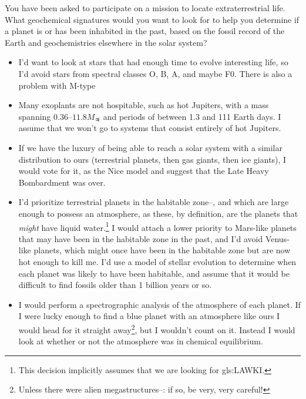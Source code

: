 \documentclass[]{article}
\begin{document}
You have been asked to participate on a mission to locate extraterrestrial life. What geochemical signatures would you want to look for to help you determine if a planet is or has been inhabited in the past, based on the fossil record of the Earth and geochemistries elsewhere in the solar system?

\begin{itemize}
	\item I'd want to look at stars that had enough time to evolve interesting life, so I'd avoid stars from spectral classes O, B, A, and maybe F0\cite{antf2019spectral}. There is also a problem with M-type\cite{dvorskywim2015this}
	\item Many exoplants are not hospitable, such as hot Jupiters\cite{ wiki:hot:jupiter}, with a mass spanning $0.36\text{--}11.8M_{\jupiter}$ and periods of between 1.3 and 111 Earth days. I assume that we won't go to systems that consist entirely of hot Jupiters.
	\item If we have the luxury of being able to reach a solar system with a similar distribution to ours (terrestrial planets, then gas giants, then ice giants), I would vote for it, as the Nice model \cite{morbidelli2010coherent} and \cite{gomes2005origin} suggest that the Late Heavy Bombardment was over.
	\item I'd prioritize terrestrial planets in the habitable zone--\cite{nasa2019goldilocks}, and which are large enough to possess an atmosphere, as these, by definition, are the planets that \textit{might} have liquid water.\footnote{This decision implicitly assumes that we are looking for \gls{gls:LAWKI}. } I would attach a lower priority to Mars-like planets that may have been in the habitable zone in the past, and I'd avoid Venus-like planets, which might once have been in the habitable zone but are now hot enough to kill me. I'd use a model of stellar evolution\cite{wiki:stellar:evolution} to determine when each planet was likely to have been habitable, and assume that it would be difficult to find fossils older than 1 billion years or so.
	\item I would perform a spectrographic analysis of the atmosphere of each planet. If I were lucky enough to find a blue planet with an atmosphere like ours I would head for it straight away\footnote{Unless there were alien megastructures--\cite{wiki:ringworld}: if so, be very, very careful!}, but I wouldn't count on it. Instead I would look at whether or not the atmosphere was in chemical equilibrium\cite{lovelock1974atmospheric}.
	\begin{itemize}

\end{itemize}
\end{itemize}
\end{document}

